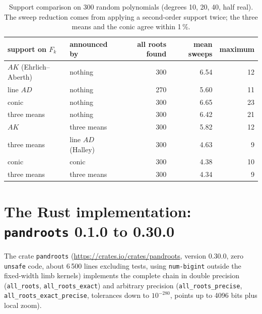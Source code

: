 \documentclass[10pt,a4paper]{article}
\theoremstyle{definition}
\numberwithin{equation}{section}
\begin{document}
\begin{table}[H]\centering\small
\begin{tabular}{llrrr}
\toprule
support on $F_k$ & announced by & all roots found & mean sweeps & maximum\\
\midrule
$AK$ (Ehrlich--Aberth) & nothing & 300 & 6.54 & 12\\
line $AD$ & nothing & 270 & 5.60 & 11\\
conic & nothing & 300 & 6.65 & 23\\
three means & nothing & 300 & 6.42 & 21\\
$AK$ & three means & 300 & 5.82 & 12\\
three means & line $AD$ (Halley) & 300 & 4.63 & 9\\
conic & conic & 300 & 4.38 & 10\\
three means & three means & 300 & 4.34 & 9\\
\bottomrule
\end{tabular}
\caption{Support comparison on 300 random polynomials (degrees 10, 20, 40, half real). The sweep reduction comes from applying a second-order support twice; the three means and the conic agree within 1\,\%.}\label{tab:support_py}
\end{table}

\section{The Rust implementation: \texttt{pandroots} 0.1.0 to 0.30.0}\label{sec:rust}
The crate \texttt{pandroots} (\url{https://crates.io/crates/pandroots}, version 0.30.0, zero \texttt{unsafe} code, about 6\,500 lines excluding tests, using \texttt{num-bigint} outside the fixed-width limb kernels) implements the complete chain in double precision (\texttt{all\_roots}, \texttt{all\_roots\_exact}) and arbitrary precision (\texttt{all\_roots\_precise}, \texttt{all\_roots\_exact\_precise}, tolerances down to $10^{-280}$, points up to 4096 bits plus local zoom).
\end{document}
